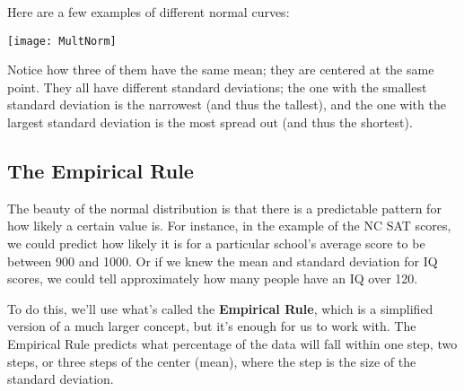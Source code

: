 Here are a few examples of different normal curves:
\begin{center}
\texttt{[image: MultNorm]}
\end{center}

Notice how three of them have the same mean; they are centered at the same point.  They all have different standard deviations; the one with the smallest standard deviation is the narrowest (and thus the tallest), and the one with the largest standard deviation is the most spread out (and thus the shortest).

\subsection{The Empirical Rule}
The beauty of the normal distribution is that there is a predictable pattern for how likely a certain value is.  For instance, in the example of the NC SAT scores, we could predict how likely it is for a particular school's average score to be between 900 and 1000.  Or if we knew the mean and standard deviation for IQ scores, we could tell approximately how many people have an IQ over 120.
\pagebreak
\text{}
\vfill

To do this, we'll use what's called the \textbf{Empirical Rule}, which is a simplified version of a much larger concept, but it's enough for us to work with.  The Empirical Rule predicts what percentage of the data will fall within one step, two steps, or three steps of the center (mean), where the step is the size of the standard deviation.
\vfill

